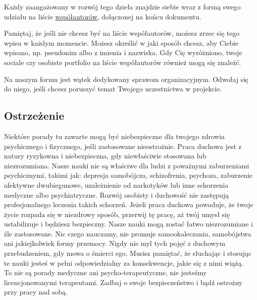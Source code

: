 \begin{multicols}{2}
    Każdy zaangażowany w rozwój tego dzieła znajdzie siebie wraz z formą swego udziału na liście \hyperref[zal:wspolautorzy]{współautorów}, dołączonej na końcu dokumentu.

    Pamiętaj, że jeśli nie chcesz być na liście współautorów, możesz zrzec się tego wpisu w każdym momencie.
    Możesz określić w jaki sposób chcesz, aby Ciebie wpisano, np. pseudonim albo z imienia i nazwiska.
    Gdy Cię wyróżniono, twoje sociale czy osobiste portfolio na liście współautorów również mogą się znaleźć.

    Na naszym forum jest wątek dedykowany sprawom organizacyjnym.
    Odwołaj się do niego, jeśli chcesz poruszyć temat Twojego uczestnictwa w projekcie.
    \vspace*{-0.8em}
\end{multicols}

\subsection*{Ostrzeżenie}
Niektóre porady tu zawarte mogą być niebezpieczne dla twojego zdrowia
psychicznego i fizycznego, jeśli zastosowane nieostrożnie.
Praca duchowa jest z natury ryzykowna i niebezpieczna, gdy niewłaściwie stosowana lub niezrozumiana.
Nasze nauki nie są właściwe dla ludzi z poważnymi zaburzeniami psychicznymi, takimi jak:
depresja samobójcza, schizofrenia, psychoza, zaburzenie afektywne dwubiegunowe, 
uzależnienie od narkotyków lub inne schorzenia medyczne albo psychiatryczne.
Rozwój osobisty i duchowość nie zastępują profesjonalnego leczenia takich schorzeń.
Jeżeli praca duchowa powoduje, że twoje życie rozpada się w niezdrowy sposób, 
przerwij tę pracę, aż twój umysł się ustabilizuje i będziesz bezpieczny.
Nasze nauki mogą zostać łatwo niezrozumiane i źle zastosowane.
Nic czego nauczamy, nie promuje samookaleczania, samobójstwa ani jakiejkolwiek formy przemocy.
Nigdy nie myl tych pojęć z duchowym przebudzeniem, gdy mowa o śmierci ego.
Musisz pamiętać, że słuchając i stosując te nauki jesteś w pełni odpowiedzialny 
za konsekwencje, jakie się z nimi wiążą.
To nie są porady medyczne ani psycho-terapeutyczne, nie jesteśmy licencjonowanymi terapeutami.
Zadbaj o swoje bezpieczeństwo i bądź ostrożny przy pracy nad sobą.

